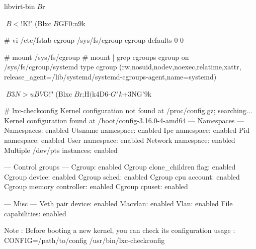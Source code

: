 \documentclass[mingoth,a4paper]{jsarticle}
\begin{document}
{{{{libvirt-bin$B$r%


$B<!$K!"(Blxc$B$GF0:n$9$k%

\begin{commandline}
  # vi /etc/fstab
  cgroup  /sys/fs/cgroup  cgroup  defaults  0   0

  # mount /sys/fs/cgroup
  # mount | grep cgroups
  cgroup on /sys/fs/cgroup/systemd type cgroup (rw,nosuid,nodev,noexec,relatime,xattr,
  release_agent=/lib/systemd/systemd-cgroups-agent,name=systemd)
\end{commandline}

$B$3$N>uBV$G!"(Blxc$B$r;H$($k4D6-$G$"$k$+3NG'$9$k%

\begin{commandline}
  # lxc-checkconfig
  Kernel configuration not found at /proc/config.gz; searching...
  Kernel configuration found at /boot/config-3.16.0-4-amd64
  --- Namespaces ---
  Namespaces: enabled
  Utsname namespace: enabled
  Ipc namespace: enabled
  Pid namespace: enabled
  User namespace: enabled
  Network namespace: enabled
  Multiple /dev/pts instances: enabled

  --- Control groups ---
  Cgroup: enabled
  Cgroup clone_children flag: enabled
  Cgroup device: enabled
  Cgroup sched: enabled
  Cgroup cpu account: enabled
  Cgroup memory controller: enabled
  Cgroup cpuset: enabled

  --- Misc ---
  Veth pair device: enabled
  Macvlan: enabled
  Vlan: enabled
  File capabilities: enabled

  Note : Before booting a new kernel, you can check its configuration
  usage : CONFIG=/path/to/config /usr/bin/lxc-checkconfig
\end{commandline}

}}}}
\end{document}
